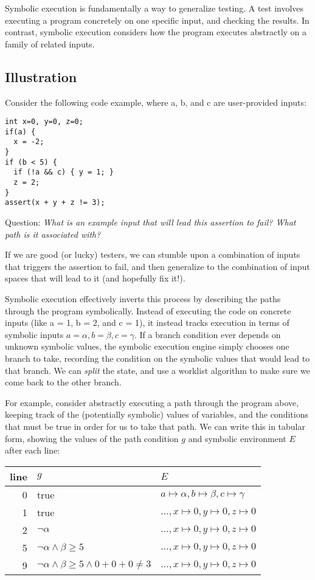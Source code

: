 \documentclass[11pt]{article}
\begin{document}
Symbolic execution is fundamentally a way to generalize testing. A test involves
executing a program concretely on one specific input, and checking the results.
In contrast, symbolic execution considers how the program executes abstractly on
a family of related inputs. 

\subsection{Illustration}

Consider the following code example, where a, b, and c are user-provided inputs:

\lstset{
         numbers=left
}

\begin{lstlisting}
int x=0, y=0, z=0;
if(a) {
  x = -2;
}
if (b < 5) {
  if (!a && c) { y = 1; }
  z = 2;
}
assert(x + y + z != 3);
\end{lstlisting}

\noindent Question: \emph{What is an example input that will lead this assertion to
fail?  What path is it associated with? }

If we are good (or lucky) testers, we can stumble upon a combination of inputs
that triggers the assertion to fail, and then generalize to the combination of
input spaces that will lead to it (and hopefully fix it!).

Symbolic execution effectively inverts this process by describing the paths
through the program symbolically. Instead of executing the code on concrete
inputs (like a = 1, b = 2, and c = 1), it instead tracks execution in terms of
symbolic inputs $a = \alpha, b = \beta, c = \gamma$. If a branch condition ever
depends on unknown symbolic values, the symbolic execution engine simply chooses
one branch to take, recording the condition on the symbolic values that would
lead to that branch. We can \emph{split} the state, and use a worklist algorithm
to make sure we come back to the other branch.

For example, consider abstractly executing a path through the program above,
keeping track of the (potentially symbolic) values of variables, and the
conditions that must be true in order for us to take that path. We can write
this in tabular form, showing the values of the path condition $g$ and symbolic
environment $E$ after each line:

\begin{tabular}{ r | l | l }

line & $g$ & $E$\\
\hline
0 & true & $a \mapsto \alpha, b \mapsto \beta, c \mapsto \gamma$ \\
1 & true & $\ldots, x \mapsto 0, y \mapsto 0, z \mapsto 0$ \\
2 & $\lnot \alpha$ & $\ldots, x \mapsto 0, y \mapsto 0, z \mapsto 0$ \\
5 & $\lnot \alpha \land \beta \ge 5$ & $\ldots, x \mapsto 0, y \mapsto 0, z \mapsto 0$ \\
9 & $\lnot \alpha \land \beta \ge 5 \land 0 + 0 + 0 \neq 3$ & $\ldots, x \mapsto 0, y \mapsto 0, z \mapsto 0$ \\

\end{tabular}
\end{document}
